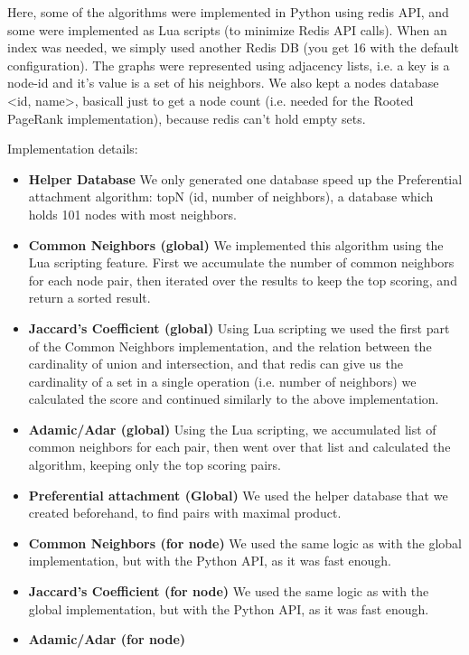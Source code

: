 Here, some of the algorithms were implemented in Python using redis API, and
some were implemented as Lua scripts (to minimize Redis API calls). When an
index was needed, we simply used another Redis DB (you get 16 with the default
configuration). 
The graphs were represented using adjacency lists, i.e. a key is a node-id and
it's value is a set of his neighbors. We also kept a nodes database <id, name>, 
basicall just to get a node count (i.e. needed for the Rooted PageRank implementation),
because redis can't hold empty sets.
\linebreak

Implementation details:
\begin{itemize}
	\item {\bf Helper Database} 
        We only generated one database speed up the Preferential attachment algorithm:
	    topN (id, number of neighbors), a database which holds 101 nodes with most neighbors.
	\item {\bf Common Neighbors (global)} 
        We implemented this algorithm using the Lua scripting feature. First we accumulate 
        the number of common neighbors for each node pair, then iterated over the results 
        to keep the top scoring, and return a sorted result.
	\item {\bf Jaccard's Coefficient (global)}
        Using Lua scripting we used the first part of the Common Neighbors implementation,
        and the relation between the cardinality of union and intersection, and that redis
        can give us the cardinality of a set in a single operation (i.e. number of neighbors)
        we calculated the score and continued similarly to the above implementation.
	\item {\bf Adamic/Adar (global)} 
        Using the Lua scripting, we accumulated list of common neighbors for each pair,
        then went over that list and calculated the algorithm, keeping only the top scoring pairs.
	\item {\bf Preferential attachment (Global)}
        We used the helper database that we created beforehand, to find pairs with maximal product.
	\item {\bf Common Neighbors (for node)}
        We used the same logic as with the global implementation, but with the Python API,
        as it was fast enough.
	\item {\bf Jaccard's Coefficient (for node)}
        We used the same logic as with the global implementation, but with the Python API,
        as it was fast enough.
	\item {\bf Adamic/Adar (for node)}

\end{itemize}
